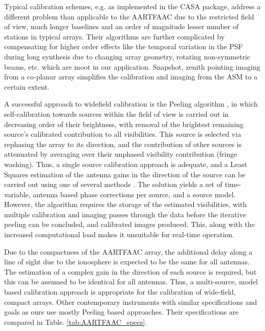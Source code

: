 \documentclass{aa}
\begin{document}
Typical calibration schemes, e.g. as  implemented in the CASA package, address a
different problem than applicable to the AARTFAAC due to the restricted field of
view, much longer baselines and an  order of magnitude lesser number of stations
in typical arrays. Their algorithms  are further complicated by compensating for
higher  order  effects  like the  temporal  variation  in  the PSF  during  long
synthesis  due  to  changing   array  geometry,  rotating  non-symmetric  beams,
etc. which are moot in our application. Snapshot, zenith pointing imaging from a
co-planar array simplifies the calibration and imaging from the ASM to a certain
extent.

A  successful  approach  to  widefield  calibration  is  the  Peeling  algorithm
\citep{noordam2004peel,vdTol2007selfcallofar}, in which self-calibration towards
sources within  the field of  view is carried  out in decreasing order  of their
brightness,  with  removal  of   the  brightest  remaining  source's  calibrated
contribution  to all  visibilities. This  source is  selected via  rephasing the
array to its  direction, and the contribution of other  sources is attenuated by
averaging over their unphased  visibility contribution (fringe washing). Thus, a
single source calibration  approach is adequate, and a  Least Squares estimation
of the antenna gains in the direction of the source can be carried out using one
of  several  methods \citep{boonstra2003gain}.  The  solution  yields  a set  of
time-variable,  antenna  based  phase  corrections  per  source,  and  a  source
model.   However,  the  algorithm   requires  the   storage  of   the  estimated
visibilities,  with multiple  calibration and  imaging passes  through  the data
before  the   iterative  peeling  can   be  concluded,  and   calibrated  images
produced. This, along with the  increased computational load makes it unsuitable
for real-time operation.

Due to the compactness of the  AARTFAAC array, the additional delay along a line
of sight due to the ionosphere is  expected to be the same for all antennas. The
estimation of  a complex gain in the  direction of each source  is required, but
this can  be assumed  to be  identical for all  antennas. Thus,  a multi-source,
model  based  calibration  approach   is  appropriate  for  the  calibration  of
wide-field,  compact  arrays.    Other  contemporary  instruments  with  similar
specifications and  goals as  ours use mostly  Peeling based  approaches.  Their
specifications are compared in Table.  \ref{tab:AARTFAAC_specs}.
\end{document}
